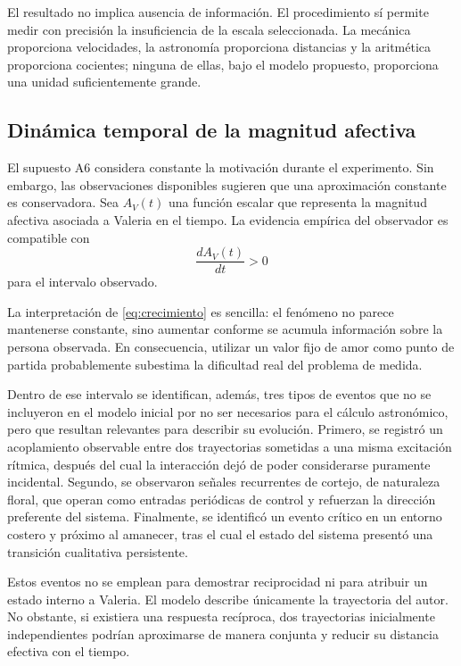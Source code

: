 \documentclass[conference]{IEEEtran}
\begin{document}
El resultado no implica ausencia de información. El procedimiento sí permite
medir con precisión la insuficiencia de la escala seleccionada. La mecánica
proporciona velocidades, la astronomía proporciona distancias y la aritmética
proporciona cocientes; ninguna de ellas, bajo el modelo propuesto, proporciona
una unidad suficientemente grande.

\subsection{Dinámica temporal de la magnitud afectiva}

El supuesto A6 considera constante la motivación durante el experimento. Sin
embargo, las observaciones disponibles sugieren que una aproximación constante
es conservadora. Sea $A_V(t)$ una función escalar que representa la magnitud
afectiva asociada a Valeria en el tiempo. La evidencia empírica del observador
es compatible con
\begin{equation}
\boxed{\;\frac{dA_V(t)}{dt}>0\;}
\label{eq:crecimiento}
\end{equation}
para el intervalo observado.

La interpretación de \eqref{eq:crecimiento} es sencilla: el fenómeno no parece
mantenerse constante, sino aumentar conforme se acumula información sobre la
persona observada. En consecuencia, utilizar un valor fijo de amor como punto
de partida probablemente subestima la dificultad real del problema de medida.

Dentro de ese intervalo se identifican, además, tres tipos de eventos que no se
incluyeron en el modelo inicial por no ser necesarios para el cálculo
astronómico, pero que resultan relevantes para describir su evolución. Primero,
se registró un acoplamiento observable entre dos trayectorias sometidas a una
misma excitación rítmica, después del cual la interacción dejó de poder
considerarse puramente incidental. Segundo, se observaron señales recurrentes
de cortejo, de naturaleza floral, que operan como entradas periódicas de control
y refuerzan la dirección preferente del sistema. Finalmente, se identificó un
evento crítico en un entorno costero y próximo al amanecer, tras el cual el
estado del sistema presentó una transición cualitativa persistente.

Estos eventos no se emplean para demostrar reciprocidad ni para atribuir un
estado interno a Valeria. El modelo describe únicamente la trayectoria del
autor. No obstante, si existiera una respuesta recíproca, dos trayectorias
inicialmente independientes podrían aproximarse de manera conjunta y reducir
su distancia efectiva con el tiempo.
\end{document}
